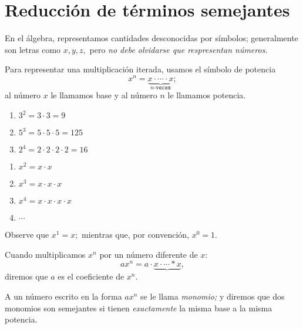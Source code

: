 
\section{Reducci\'on de t\'erminos semejantes}

 En el álgebra, representamos cantidades desconocidas por s\'imbolos;  generalmente son letras como $x,y,z,$ pero \emph{no debe olvidarse que respresentan números.}



	Para representar una multiplicaci\'on iterada, usamos el s\'imbolo de potencia
	$$
	x^{n}=\underbrace{x\cdot\cdots \cdot x}_{n\texttt{-veces}};
	$$
	al número $x$ le llamamos base y al número $n$ le llamamos potencia.



	\begin{problema}
		\begin{enumerate}
			\item $3^{2}=3\cdot3=9$
			\item $5^{3}=5\cdot5\cdot5=125$
			\item $2^{4}=2\cdot2\cdot2\cdot2=16$
		\end{enumerate}
		
	\end{problema}
	



	\begin{problema}
		\begin{enumerate}
			\item $x^{2}=x\cdot x$
			\item $x^{3}=x\cdot x\cdot x$
			\item $x^{4}=x\cdot x\cdot x\cdot x$
			\item $\cdots$
		\end{enumerate}
		
	\end{problema}




	\begin{observacion}
		Observe que $x^{1}=x;$ mientras que, por convenci\'on, $x^{0}=1.$
	\end{observacion}
	



	Cuando multiplicamos $x^{n}$ por un número diferente de $x:$
	$$ax^{n}=a\cdot\underbrace{x\cdot\cdots *x},$$ diremos que $a$ es el coeficiente de $x^{n}.$ 



	A un número escrito en la forma $ax^{n}$ se le llama \emph{monomio;} y diremos que dos monomios son semejantes si tienen \emph{exactamente} la misma base a la misma potencia.



